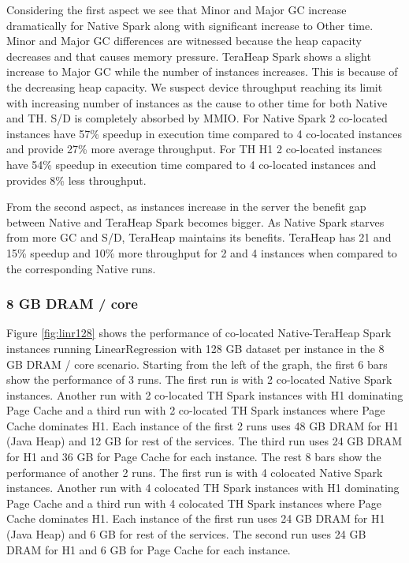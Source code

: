 Considering the first aspect we see that Minor and Major GC increase dramatically for Native Spark along with significant increase to Other time. Minor and Major GC differences are witnessed because the heap capacity decreases and that causes memory pressure. TeraHeap Spark shows a slight increase to Major GC while the number of instances increases. This is because of the decreasing heap capacity. We suspect device throughput reaching its limit with increasing number of instances as the cause to other time for both Native and TH. S/D is completely absorbed by MMIO. For Native Spark 2 co-located instances have 57\% speedup in execution time compared to 4 co-located instances and provide 27\% more average throughput. For TH H1 2 co-located instances have 54\% speedup in execution time compared to 4 co-located instances and provides 8\% less throughput.

From the second aspect, as instances increase in the server the benefit gap between Native and TeraHeap Spark becomes bigger. As Native Spark starves from more GC and S/D, TeraHeap maintains its benefits. TeraHeap has 21 and 15\% speedup and 10\% more throughput for 2 and 4 instances when compared to the corresponding Native runs.

\subsubsection{8 GB DRAM / core}

Figure \ref{fig:linr128} shows the performance of co-located
Native-TeraHeap Spark instances running LinearRegression with 128 GB
dataset per instance in the 8 GB DRAM / core scenario.
Starting from the left of the graph, the first 6 bars show the
performance of 3 runs. The first run is with 2 co-located Native Spark instances.
Another run with 2 co-located TH Spark instances with H1 dominating Page Cache
and a third run with 2 co-located TH Spark instances where Page Cache dominates H1.
Each instance of the first 2 runs uses 48 GB DRAM for H1 (Java Heap) and 12 GB for rest of the services.
The third run uses 24 GB DRAM for H1 and 36 GB for Page Cache for each instance.
The rest 8 bars show the performance of another 2 runs. The first run is with 4 colocated Native Spark instances.
Another run with 4 colocated TH Spark instances with H1 dominating Page Cache
and a third run with 4 colocated TH Spark instances where Page Cache dominates H1.
Each instance of the first run uses 24 GB DRAM for H1 (Java Heap) and 6 GB for rest of the services.
The second run uses 24 GB DRAM for H1 and 6 GB for Page Cache for each instance.

